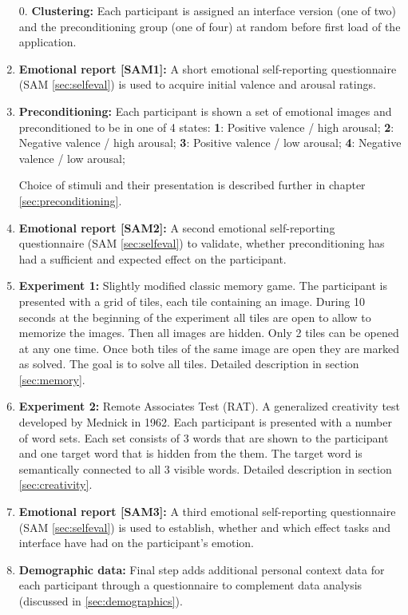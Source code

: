 	\begin{enumerate}
		
		\item[0.] \textbf{Clustering:} Each participant is assigned an interface version (one of two) and the preconditioning group (one of four) at random before first load of the application.
		
		\item \textbf{Emotional report [SAM1]:} A short emotional self-reporting questionnaire (SAM \ref{sec:selfeval}) is used to acquire initial valence and arousal ratings.
		
		\item \textbf{Preconditioning:} Each participant is shown a set of emotional images and preconditioned to be in one of 4 states:
			\textbf{1}: Positive valence / high arousal;
			\textbf{2}: Negative valence / high arousal;
			\textbf{3}: Positive valence / low arousal;
			\textbf{4}: Negative valence / low arousal;
			
		Choice of stimuli and their presentation is described further in chapter \ref{sec:preconditioning}.
			
		\item \textbf{Emotional report [SAM2]:} A second emotional self-reporting questionnaire (SAM \ref{sec:selfeval}) to validate, whether preconditioning has had a sufficient and expected effect on the participant.
		
		\item \textbf{Experiment 1:} Slightly modified classic memory game. The participant is presented with a grid of tiles, each tile containing an image. During 10 seconds at the beginning of the experiment all tiles are open to allow to memorize the images. Then all images are hidden. Only 2 tiles can be opened at any one time. Once both tiles of the same image are open they are marked as solved. The goal is to solve all tiles. Detailed description in section \ref{sec:memory}.
		
		\item \textbf{Experiment 2:} Remote Associates Test (RAT). A generalized creativity test developed by Mednick \cite{Mednick1962} in 1962. Each participant is presented with a number of word sets. Each set consists of 3 words that are shown to the participant and one target word that is hidden from the them. The target word is semantically connected to all 3 visible words. Detailed description in section \ref{sec:creativity}.
		
		\item \textbf{Emotional report [SAM3]:} A third emotional self-reporting questionnaire (SAM \ref{sec:selfeval}) is used to establish, whether and which effect tasks and interface have had on the participant's emotion.
		
		\item \textbf{Demographic data:} Final step adds additional personal context data for each participant through a questionnaire to complement data analysis (discussed in \ref{sec:demographics}).
		
	\end{enumerate}
	
